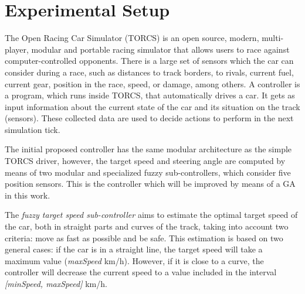 \documentclass[conference]{IEEEtran}
\begin{document}
\section{Experimental Setup}
\label{sec:torcs}

The Open Racing Car Simulator (TORCS) \cite{WebTORCS} is an open source, modern, multi-player, modular and portable racing simulator that allows users to race against computer-controlled opponents.
There is a large set of sensors \cite{Torcs3} which the car can consider during a race, such as distances to track borders, to rivals, current fuel, current gear, position in the race, speed, or damage, among others.
A controller is a program, which runs inside TORCS, that automatically
drives a car. It gets as input information about the current state of
the car and its situation on the track (sensors). These collected data
are used to decide actions to perform in the next simulation tick.  


The initial proposed controller \cite{evo17} has the same modular
architecture as the simple TORCS driver, however, the target speed and
steering angle are computed by means of two modular and specialized
fuzzy sub-controllers, which consider five position sensors. This is
the controller which will be improved by means of a GA in this
work.

The {\em fuzzy target speed sub-controller} aims to estimate the
optimal target speed of the car, both in straight parts and curves of
the track, taking into account two criteria: move as fast as possible
and be safe. This estimation is based on two general cases: if the car
is in a straight line, the target speed will take a maximum value
(\textit{maxSpeed} km/h). However, if it is close to a curve, the
controller will decrease the current speed to a value included in the
interval \textit{[minSpeed, maxSpeed]} km/h. 
\end{document}
